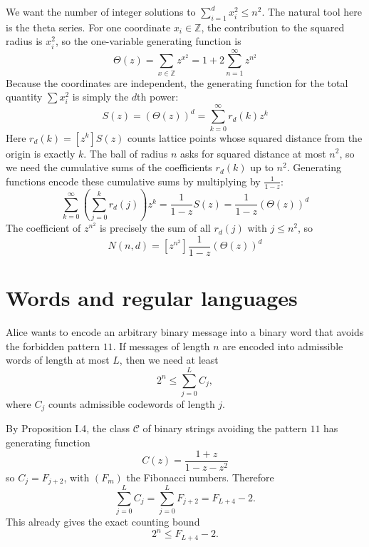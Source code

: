 We want the number of integer solutions to $\sum_{i = 1}^{d} x_{i}^{2} \le n^{2}$.
The natural tool here is the theta series. For one coordinate $x_{i} \in \mathbb{Z}$, the contribution to the squared radius is $x_{i}^{2}$, so the one-variable generating function is
\begin{equation*}
    \Theta(z) = \sum_{x \in \mathbb{Z}}z^{x^{2}} = 1 + 2 \sum_{n = 1}^{\infty} z^{n^{2}}
\end{equation*}
Because the coordinates are independent, the generating function for the total quantity $\sum x_{i}^{2}$ is simply the $d$th power:
\begin{equation*}
    S(z) = (\Theta(z))^{d} = \sum_{k = 0}^{\infty} r_{d}(k)z^{k}
\end{equation*}
Here $r_{d}(k) = [z^{k}]S(z)$ counts lattice points whose squared distance from the origin is
exactly $k$. The ball of radius $n$ asks for squared distance at most $n^{2}$, so we need the
cumulative sums of the coefficients $r_{d}(k)$ up to $n^{2}$. Generating functions encode
these cumulative sums by multiplying by $\frac{1}{1 - z}$:
\begin{equation*}
    \sum_{k = 0}^{\infty} \left(\sum_{j = 0}^{k} r_{d}(j)\right)z^{k} = \frac{1}{1 - z} S(z) = \frac{1}{1 - z}(\Theta(z))^{d}
\end{equation*}
The coefficient of $z^{n^{2}}$ is precisely the sum of all $r_{d}(j)$ with $j \leq n^{2}$, so
\begin{equation*}
    N(n, d) = [z^{n^{2}}] \frac{1}{1 - z}(\Theta(z))^{d}
\end{equation*}

\section{Words and regular languages}

Alice wants to encode an arbitrary binary message into a binary word that avoids the forbidden pattern $11$.
If messages of length $n$ are encoded into admissible words of length at most $L$, then we need at least
\begin{equation*}
    2^{n} \leq \sum_{j = 0}^{L} C_{j},
\end{equation*}
where $C_{j}$ counts admissible codewords of length $j$.

By Proposition I.4, the class $\mathcal{C}$ of binary strings avoiding the pattern $11$ has generating function
\begin{equation*}
    C(z) = \frac{1 + z}{1 - z - z^{2}}
\end{equation*}
so $C_{j} = F_{j + 2}$, with $(F_{m})$ the Fibonacci numbers. Therefore
\begin{equation*}
    \sum_{j = 0}^{L} C_{j} = \sum_{j = 0}^{L} F_{j + 2} = F_{L + 4} - 2.
\end{equation*}
This already gives the exact counting bound
\begin{equation*}
    2^{n} \leq F_{L + 4} - 2.
\end{equation*}

